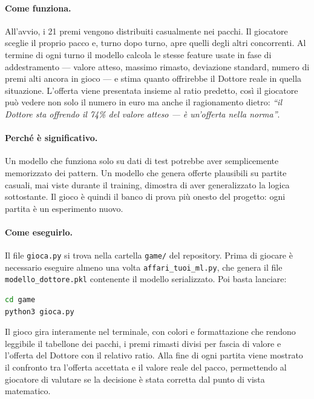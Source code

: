 \documentclass[12pt, a4paper]{article}
\begin{document}
\paragraph{Come funziona.}
All'avvio, i 21 premi vengono distribuiti casualmente nei pacchi.
Il giocatore sceglie il proprio pacco e, turno dopo turno, apre quelli
degli altri concorrenti. Al termine di ogni turno il modello calcola
le stesse feature usate in fase di addestramento — valore atteso,
massimo rimasto, deviazione standard, numero di premi alti ancora in
gioco — e stima quanto offrirebbe il Dottore reale in quella situazione.
L'offerta viene presentata insieme al ratio predetto, così il giocatore
può vedere non solo il numero in euro ma anche il ragionamento dietro:
\textit{``il Dottore sta offrendo il 74\% del valore atteso — è
un'offerta nella norma''}.

\paragraph{Perché è significativo.}
Un modello che funziona solo su dati di test potrebbe aver semplicemente
memorizzato dei pattern. Un modello che genera offerte plausibili su
partite casuali, mai viste durante il training, dimostra di aver
generalizzato la logica sottostante. Il gioco è quindi il banco di prova
più onesto del progetto: ogni partita è un esperimento nuovo.

\paragraph{Come eseguirlo.}
Il file \texttt{gioca.py} si trova nella cartella \texttt{game/}
del repository. Prima di giocare è necessario eseguire almeno una volta
\texttt{affari\_tuoi\_ml.py}, che genera il file
\texttt{modello\_dottore.pkl} contenente il modello serializzato.
Poi basta lanciare:

\begin{lstlisting}[language=bash, caption={Avvio del gioco da terminale}]
cd game
python3 gioca.py
\end{lstlisting}

Il gioco gira interamente nel terminale, con colori e formattazione
che rendono leggibile il tabellone dei pacchi, i premi rimasti divisi
per fascia di valore e l'offerta del Dottore con il relativo ratio.
Alla fine di ogni partita viene mostrato il confronto tra l'offerta
accettata e il valore reale del pacco, permettendo al giocatore di
valutare se la decisione è stata corretta dal punto di vista matematico.
\end{document}
